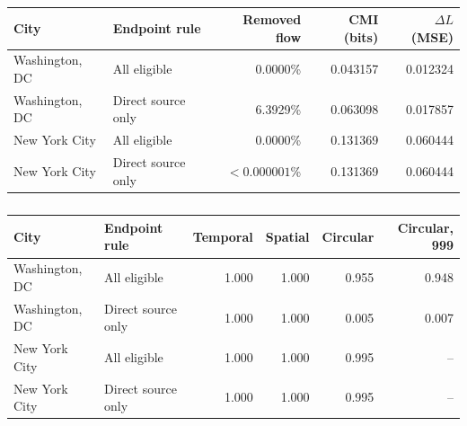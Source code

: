 \begin{table}[!htbp]
\caption{}
\label{tab:coordinate_source_sensitivity}
\centering
\color{red}
\begin{tabular*}{\textwidth}{@{\extracolsep{\fill}}llrrr@{}}
\toprule
\textbf{City} & \textbf{Endpoint rule} & \textbf{Removed flow} &
\textbf{CMI (bits)} & \textbf{$\Delta L$ (MSE)}\\
\midrule
Washington, DC & All eligible & 0.0000\% & 0.043157 & 0.012324\\
Washington, DC & Direct source only & 6.3929\% & 0.063098 & 0.017857\\
New York City & All eligible & 0.0000\% & 0.131369 & 0.060444\\
New York City & Direct source only & $<0.000001$\% & 0.131369 & 0.060444\\
\bottomrule
\end{tabular*}
\end{table}

\begin{table}[!htbp]
\caption{}
\label{tab:coordinate_source_randomization}
\centering
\color{red}
\begin{tabular*}{\textwidth}{@{\extracolsep{\fill}}llrrrr@{}}
\toprule
\textbf{City} & \textbf{Endpoint rule} & \textbf{Temporal} &
\textbf{Spatial} & \textbf{Circular} & \textbf{Circular, 999}\\
\midrule
Washington, DC & All eligible & 1.000 & 1.000 & 0.955 & 0.948\\
Washington, DC & Direct source only & 1.000 & 1.000 & 0.005 & 0.007\\
New York City & All eligible & 1.000 & 1.000 & 0.995 & --\\
New York City & Direct source only & 1.000 & 1.000 & 0.995 & --\\
\bottomrule
\end{tabular*}
\end{table}

